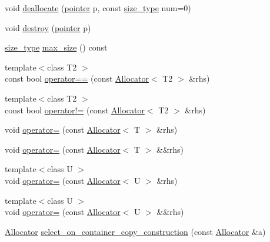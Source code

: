 \begin{DoxyCompactItemize}
\item 
void \hyperlink{classprism_1_1_allocator_aca700b82234799c7a1e90e89d40f7445}{deallocate} (\hyperlink{classprism_1_1_allocator_ad3c6706a7243bd3ef489e16d34d5750f}{pointer} p, const \hyperlink{classprism_1_1_allocator_a47cb9435e4e9ff4c934ea3d4b4338d52}{size\+\_\+type} num=0)
\item 
void \hyperlink{classprism_1_1_allocator_a660832107a9bc094324adf9da718fa43}{destroy} (\hyperlink{classprism_1_1_allocator_ad3c6706a7243bd3ef489e16d34d5750f}{pointer} p)
\item 
\hyperlink{classprism_1_1_allocator_a47cb9435e4e9ff4c934ea3d4b4338d52}{size\+\_\+type} \hyperlink{classprism_1_1_allocator_adc3d03562ab64759d8a48a191ff344d8}{max\+\_\+size} () const 
\item 
{\footnotesize template$<$class T2 $>$ }\\const bool \hyperlink{classprism_1_1_allocator_a6e4d64dc74ef98bae3cb13eef532116c}{operator==} (const \hyperlink{classprism_1_1_allocator}{Allocator}$<$ T2 $>$ \&rhs)
\item 
{\footnotesize template$<$class T2 $>$ }\\const bool \hyperlink{classprism_1_1_allocator_aa1b7baa61a8e3938861dc0e9e9d369a5}{operator!=} (const \hyperlink{classprism_1_1_allocator}{Allocator}$<$ T2 $>$ \&rhs)
\item 
void \hyperlink{classprism_1_1_allocator_a58dd5e4718b753f0e64b1d9c00089b46}{operator=} (const \hyperlink{classprism_1_1_allocator}{Allocator}$<$ T $>$ \&rhs)
\item 
void \hyperlink{classprism_1_1_allocator_ae35090442e453eec485e61afd3959a04}{operator=} (const \hyperlink{classprism_1_1_allocator}{Allocator}$<$ T $>$ \&\&rhs)
\item 
{\footnotesize template$<$class U $>$ }\\void \hyperlink{classprism_1_1_allocator_ae723165ce5bf6f080ec58f45e16acf5c}{operator=} (const \hyperlink{classprism_1_1_allocator}{Allocator}$<$ U $>$ \&rhs)
\item 
{\footnotesize template$<$class U $>$ }\\void \hyperlink{classprism_1_1_allocator_a17b523e405b81ddc67a68b028c4d5da9}{operator=} (const \hyperlink{classprism_1_1_allocator}{Allocator}$<$ U $>$ \&\&rhs)
\item 
\hyperlink{classprism_1_1_allocator}{Allocator} \hyperlink{classprism_1_1_allocator_ae1359cd2729046151b42c55365e57139}{select\+\_\+on\+\_\+container\+\_\+copy\+\_\+construction} (const \hyperlink{classprism_1_1_allocator}{Allocator} \&a)
\end{DoxyCompactItemize}


